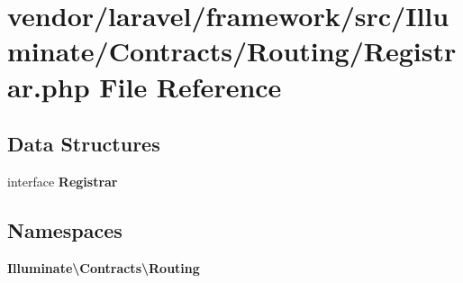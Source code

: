 \section{vendor/laravel/framework/src/\+Illuminate/\+Contracts/\+Routing/\+Registrar.php File Reference}
\label{vendor_2laravel_2framework_2src_2_illuminate_2_contracts_2_routing_2_registrar_8php}
\subsection*{Data Structures}
\begin{DoxyCompactItemize}
\item 
interface {\bf Registrar}
\end{DoxyCompactItemize}
\subsection*{Namespaces}
\begin{DoxyCompactItemize}
\item 
 {\bf Illuminate\textbackslash{}\+Contracts\textbackslash{}\+Routing}
\end{DoxyCompactItemize}
